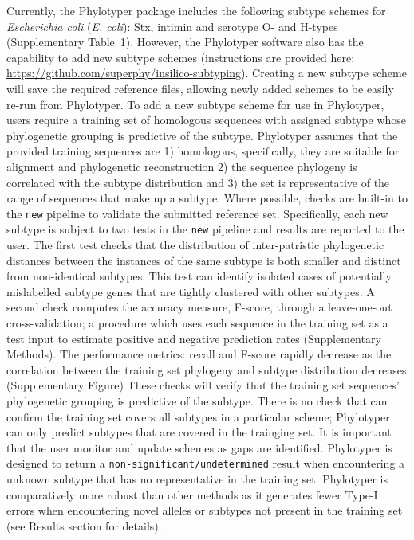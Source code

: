 \documentclass{bioinfo}
\begin{document}
Currently, the Phylotyper package includes the following subtype schemes for \emph{Escherichia coli} (\textit{E. coli}): Stx, intimin and serotype O- and H-types  (Supplementary Table~1).
However, the Phylotyper software also has the capability to add new subtype schemes (instructions are provided here: \url{https://github.com/superphy/insilico-subtyping}). 
Creating a new subtype scheme will save the required reference files, allowing newly added schemes to be easily re-run from Phylotyper.
To add a new subtype scheme for use in Phylotyper, users require a training set of homologous sequences with assigned subtype whose phylogenetic grouping is predictive of the subtype.
Phylotyper assumes that the provided training sequences are 1) homologous, specifically, they are suitable for alignment and phylogenetic reconstruction 2) the sequence phylogeny is correlated with the subtype distribution and 3) the set is representative of the range of sequences that make up a subtype.
Where possible, checks are built-in to the \texttt{new} pipeline to validate the submitted reference set.
Specifically, each new subtype is subject to two tests in the \texttt{new} pipeline and results are reported to the user.
The first test checks that the distribution of inter-patristic phylogenetic distances between the instances of the same subtype is both smaller and distinct from non-identical subtypes.
This test can identify isolated cases of potentially mislabelled subtype genes that are tightly clustered with other subtypes.
A second check computes the accuracy measure, F-score, through a leave-one-out cross-validation; a procedure which uses each sequence in the training set as a test input to estimate positive and negative prediction rates (Supplementary Methods).
The performance metrics: recall and F-score rapidly decrease as the correlation between the training set phylogeny and subtype distribution decreases (Supplementary Figure)
These checks will verify that the training set sequences' phylogenetic grouping is predictive of the subtype.
There is no check that can confirm the training set covers all subtypes in a particular scheme; Phylotyper can only predict subtypes that are covered in the trainging set.
It is important that the user monitor and update schemes as gaps are identified.
Phylotyper is designed to return a \texttt{non-significant/undetermined} result when encountering a unknown subtype that has no representative in the training set.
Phylotyper is comparatively more robust than other methods as it generates fewer Type-I errors when encountering novel alleles or subtypes not present in the training set (see Results section for details).
\end{document}

